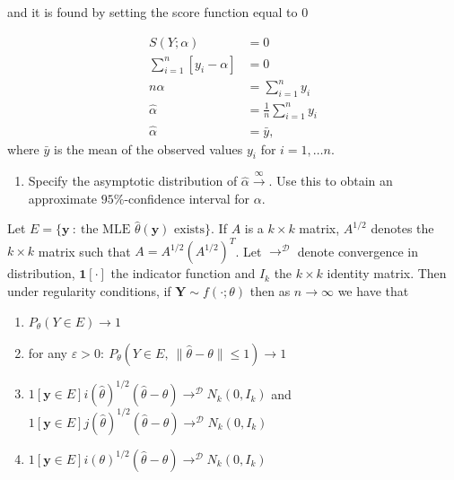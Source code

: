 and it is found by setting the score function equal to $0$

\begin{align*}
    S\left(Y; \alpha \right) &= 0\\
    \sum_{i=1}^n \left[y_i - \alpha \right]&= 0\\
    n\alpha &= \sum_{i=1}^n y_i\\
    \hat{\alpha} &= \frac{1}{n} \sum_{i=1}^n y_i \\
    \hat{\alpha} &= \bar{y},
\end{align*}
where $\bar{y}$ is the mean of the observed values $y_i$ for $i = 1, \ldots n$.

\begin{enumerate}[resume]
    \item  Specify the asymptotic distribution of $\hat{\alpha}\xrightarrow \infty$. Use this to obtain an approximate $95\%$-confidence interval for $\alpha$.
\end{enumerate}

\begin{theorem}
Let $E = \{\mathbf{y} \ : \ \text{the MLE } \hat{\theta}(\mathbf{y}) \text{ exists}\}$. 
If $A$ is a $k \times k$ matrix, $A^{1/2}$ denotes the $k \times k$ matrix such that $A = A^{1/2}\left( A^{1/2} \right)^T$.
Let $\rightarrow^\mathcal{D}$ denote convergence in distribution, $\mathbf{1}[\cdot]$ the indicator function and $I_k$ the $k \times k$ identity matrix.
Then under regularity conditions, if $\mathbf{Y} \sim f(\cdot;\theta)$ then as $n \rightarrow \infty$ we have that
\begin{enumerate}
    \item $P_\theta(Y \in E) \rightarrow 1$
    \item for any $\varepsilon > 0: \ P_\theta(Y \in E, \ \|\hat{\theta} - \theta\| \leq 1) \rightarrow 1$
    \item $1[\mathbf{y} \in E] i(\hat{\theta})^{1/2}(\hat{\theta} - \theta) \rightarrow^\mathcal{D} N_k(0, I_k)$ and $1[\mathbf{y} \in E] j(\hat{\theta})^{1/2}(\hat{\theta} - \theta) \rightarrow^\mathcal{D} N_k(0, I_k)$
    \item $1[\mathbf{y} \in E] i(\theta)^{1/2}(\hat{\theta} - \theta) \rightarrow^\mathcal{D} N_k(0, I_k)$
\end{enumerate}
\end{theorem}


